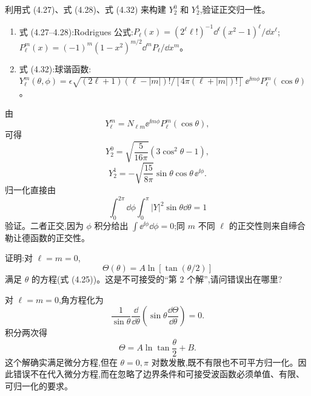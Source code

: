 \begin{question}
利用式 (4.27)、式 (4.28)、式 (4.32) 来构建 $Y_2^0$ 和 $Y_2^1$,验证正交归一性。

\par\smallskip
{}
\begin{enumerate}[leftmargin=2.2em,itemsep=0.12em,topsep=0.12em,parsep=0pt]
\item 式 (4.27--4.28):Rodrigues 公式:$P_\ell(x)=(2^\ell\ell!)^{-1}\dd^\ell(x^2-1)^\ell/\dd x^\ell$;$P_\ell^m(x)=(-1)^m(1-x^2)^{m/2}\dd^mP_\ell/\dd x^m$。
\item 式 (4.32):球谐函数:$Y_\ell^m(\theta,\phi)=\epsilon\sqrt{(2\ell+1)(\ell-|m|)!/[4\pi(\ell+|m|)!]}\,\ee^{\ii m\phi}P_\ell^m(\cos\theta)$。
\end{enumerate}

\end{question}
\begin{solution}

由
\[
Y_\ell^m=N_{\ell m}\ee^{\ii m\phi}P_\ell^m(\cos\theta),
\]
可得
\[
Y_2^0=\sqrt{\frac{5}{16\pi}}(3\cos^2\theta-1),
\]
\[
Y_2^1=-\sqrt{\frac{15}{8\pi}}\sin\theta\cos\theta\,\ee^{\ii\phi}.
\]
归一化直接由
\[
\int_0^{2\pi}\!\dd\phi\int_0^\pi |Y|^2\sin\theta\dd\theta=1
\]
验证。二者正交,因为 $\phi$ 积分给出 $\int \ee^{\ii\phi}\dd\phi=0$;同 $m$ 不同 $\ell$ 的正交性则来自缔合勒让德函数的正交性。

\end{solution}

\begin{question}
证明:对 $\ell=m=0$,
\[
\Theta(\theta)=A\ln[\tan(\theta/2)]
\]
满足 $\theta$ 的方程(式 (4.25))。这是不可接受的“第 2 个解”,请问错误出在哪里?

\par\smallskip
{}

\end{question}
\begin{solution}

对 $\ell=m=0$,角方程化为
\[
\frac{1}{\sin\theta}\frac{\dd}{\dd\theta}\left(\sin\theta\frac{\dd\Theta}{\dd\theta}\right)=0.
\]
积分两次得
\[
\Theta=A\ln\tan\frac{\theta}{2}+B.
\]
这个解确实满足微分方程,但在 $\theta=0,\pi$ 对数发散,既不有限也不可平方归一化。因此错误不在代入微分方程,而在忽略了边界条件和可接受波函数必须单值、有限、可归一化的要求。

\end{solution}


